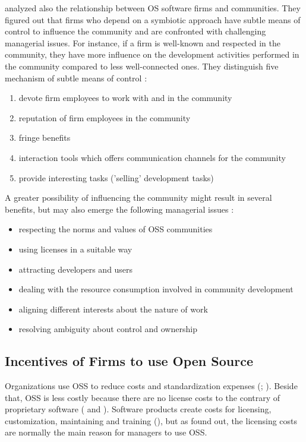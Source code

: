 \cite{dahlander2010open} analyzed also the relationship between OS software firms and communities. They figured out that firms who depend on a symbiotic approach have subtle means of control to influence the community and are confronted with challenging managerial issues. For instance, if a firm is well-known and respected in the community, they have more influence on the development activities performed in the community compared to less well-connected ones. They distinguish five mechanism of subtle means of control \cite[p.489]{dahlander2005relationships}:

\begin{enumerate}
	\item devote firm employees to work with and in the community
	\item reputation of firm employees in the community
	\item fringe benefits
	\item interaction tools which offers communication channels for the community
	\item provide interesting tasks ('selling' development tasks)
\end{enumerate}

A greater possibility of influencing the community might result in several benefits, but may also emerge the following managerial issues \cite[p.489]{dahlander2005relationships}:

\begin{itemize}
	\item respecting the norms and values of OSS communities
	\item using licenses in a suitable way
	\item attracting developers and users
	\item dealing with the resource consumption involved in community development
	\item aligning different interests about the nature of work
	\item resolving ambiguity about control and ownership
\end{itemize}

\subsection{Incentives of Firms to use Open Source}

Organizations use OSS to reduce costs and standardization expenses (\cite{wichmann2002free}; \cite{ghosh2007economic}). Beside that, OSS is less costly because there are no license costs to the contrary of proprietary software (\cite{hawkins2004economics} and \cite{wichmann2002free}). Software products create costs for licensing, customization, maintaining and training (\cite{weiss2005real}), but as \cite{wichmann2002free} found out, the licensing costs are normally the main reason for managers to use OSS.

